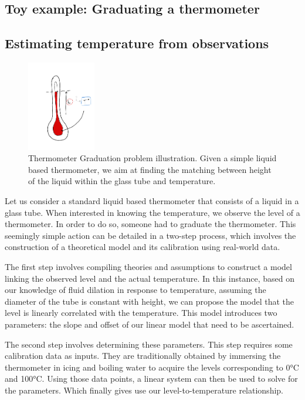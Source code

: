 \begin{bibunit}
  \section{Toy example: Graduating a thermometer}


\subsection{Estimating temperature from observations}
\begin{figure}[h]
    \centering
        \includegraphics[clip, width=3cm]{Introduction/pics/therm_pb.png}
    \caption{Thermometer Graduation problem illustration. Given a simple liquid based thermometer, we aim at finding the matching between height of the liquid within the glass tube and temperature.}
    \label{fig:therm_calib}
\end{figure}

Let us consider a standard liquid based thermometer that consists of a liquid in a glass tube.
When interested in knowing the temperature, we observe the level of a thermometer.
In order to do so, someone had to graduate the thermometer. 
This seemingly simple action can be detailed in a two-step process, which involves the construction of a theoretical model and its calibration using real-world data.

The first step involves compiling theories and assumptions to construct a model linking the observed level and the actual temperature.
In this instance, based on our knowledge of fluid dilation in response to temperature, assuming the diameter of the tube is constant with height, we can propose the model that the level is linearly correlated with the temperature.
This model introduces two parameters: the slope and offset of our linear model that need to be ascertained.

The second step involves determining these parameters. This step requires some calibration data as inputs. They are traditionally obtained by immersing the thermometer in icing and boiling water to acquire the levels corresponding to 0°C and 100°C.
  Using those data points, a linear system can then be used to solve for the parameters. Which finally gives use our level-to-temperature relationship.



\end{bibunit}
